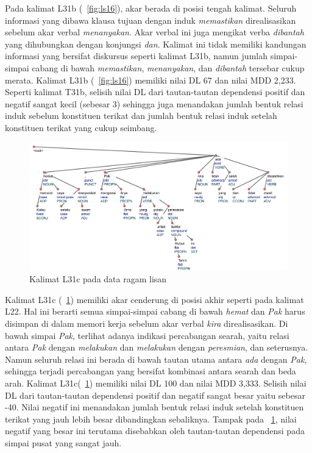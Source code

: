 Pada kalimat L31b (\pic~\ref{fig:ls16}), akar berada di posisi tengah kalimat. Seluruh informasi yang dibawa klausa tujuan dengan induk \textit{memastikan} direalisasikan sebelum akar verbal \textit{menanyakan}. Akar verbal ini juga mengikat verba \textit{dibantah} yang dihubungkan dengan konjungsi \textit{dan}. Kalimat ini tidak memiliki kandungan informasi yang bersifat diskursus seperti kalimat L31b, namun jumlah simpai-simpai cabang di bawah \textit{memastikan}, \textit{menanyakan}, dan \textit{dibantah} tersebar cukup merata. Kalimat L31b (\pic~\ref{fig:ls16}) memiliki nilai DL 67 dan nilai MDD 2,233. Seperti kalimat T31b, selisih nilai DL dari tautan-tautan dependensi positif dan negatif sangat kecil (sebesar 3) sehingga juga menandakan jumlah bentuk relasi induk sebelum konstituen terikat dan jumlah bentuk relasi induk setelah konstituen terikat yang cukup seimbang. 

\begin{figure}
	\centering \includegraphics[width=1
	\textwidth] {pics/ls114.jpg} 
	\caption{Kalimat L31c pada data ragam lisan}
	\label{fig:ls114} 
\end{figure}

Kalimat L31c (\pic~\ref{fig:ls114}) memiliki akar cenderung di posisi akhir seperti pada kalimat L22. Hal ini berarti semua simpai-simpai cabang di bawah \textit{hemat} dan \textit{Pak} harus disimpan di dalam memori kerja sebelum akar verbal \textit{kira} direalisasikan. Di bawah simpai \textit{Pak}, terlihat adanya indikasi percabangan searah, yaitu relasi antara \textit{Pak} dengan \textit{melakukan} dan \textit{melakukan} dengan \textit{peresmian}, dan seterusnya. Namun seluruh relasi ini berada di bawah tautan utama antara \textit{ada} dengan \textit{Pak}, sehingga terjadi percabangan yang bersifat kombinasi antara searah dan beda arah. Kalimat L31c(\pic~\ref{fig:ls114}) memiliki nilai DL 100 dan nilai MDD 3,333. Selisih nilai DL dari tautan-tautan dependensi positif dan negatif sangat besar yaitu sebesar -40. Nilai negatif ini menandakan jumlah bentuk relasi induk setelah konstituen terikat yang jauh lebih besar dibandingkan sebaliknya. Tampak pada \pic~\ref{fig:ls114}, nilai negatif yang besar ini terutama disebabkan oleh tautan-tautan dependensi pada simpai pusat yang sangat jauh.

